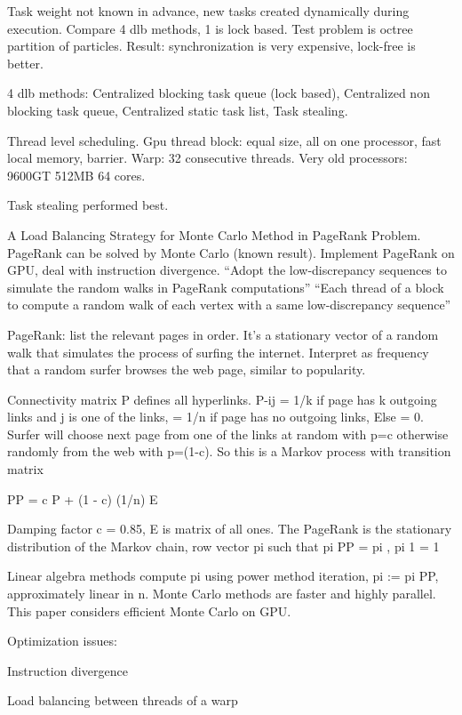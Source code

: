 \documentclass{article}
\begin{document}
Task weight not known in advance, new tasks created dynamically during execution.
Compare 4 dlb methods, 1 is lock based.
Test problem is octree partition of particles.
Result: synchronization is very expensive, lock-free is better.

4 dlb methods:
Centralized blocking task queue (lock based),
Centralized non blocking task queue,
Centralized static task list,
Task stealing.

Thread level scheduling.
Gpu thread block: equal size, all on one processor, fast local memory, barrier.
Warp: 32 consecutive threads.
Very old processors: 9600GT 512MB 64 cores.

Task stealing performed best.


\cite{10.1007/978-981-10-6442-5_56}

A Load Balancing Strategy for Monte Carlo Method in PageRank Problem.
PageRank can be solved by Monte Carlo (known result).
Implement PageRank on GPU, deal with instruction divergence.
“Adopt the low-discrepancy sequences to simulate the random walks in PageRank computations”
“Each thread of a block to compute a random walk of each vertex with a same low-discrepancy sequence”

PageRank: list the relevant pages in order.
It’s a stationary vector of a random walk that simulates the process of surfing the internet.
Interpret as frequency that a random surfer browses the web page, similar to popularity.

Connectivity matrix P defines all hyperlinks.
P-ij = 1/k if page has k outgoing links and j is one of the links,
 = 1/n if page has no outgoing links,
Else = 0.
Surfer will choose next page from one of the links at random with p=c otherwise randomly from the web with p=(1-c).
So this is a Markov process with transition matrix

PP = c P + (1 - c) (1/n) E

Damping factor c = 0.85,
E is matrix of all ones.
The PageRank is the stationary distribution of the Markov chain, row vector pi such that
pi PP = pi , pi 1 = 1

Linear algebra methods compute pi using power method iteration, pi := pi PP, approximately linear in n.
Monte Carlo methods are faster and highly parallel.
This paper considers efficient Monte Carlo on GPU.

Optimization issues:

Instruction divergence

Load balancing between threads of a warp
\end{document}
